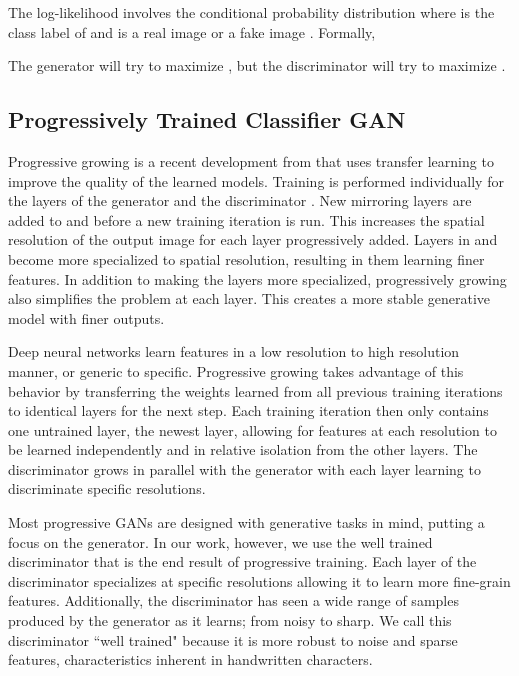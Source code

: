 \documentclass[runningheads]{llncs}
\begin{document}
The log-likelihood  involves the conditional probability distribution   where  is the class label  of  and  is a real image  or a fake image . Formally, 

The generator  will  try to maximize , but the discriminator  will try to maximize .


\subsection{Progressively Trained Classifier GAN}\label{prog}

Progressive growing is a recent development from \cite{nvidia2017progressive} that uses transfer learning to improve the quality of the learned models. Training is performed individually for the layers of the generator  and the discriminator . New mirroring layers are added to  and  before a new training iteration is run. This increases the spatial resolution of the output image for each layer progressively added. Layers in  and  become more specialized to  spatial resolution, resulting in them learning finer features. In addition to making the layers more specialized, progressively growing also simplifies the problem at each layer. This creates a more stable generative model with finer outputs. 

Deep neural networks learn features in a low resolution to high resolution manner, or generic to specific. Progressive growing takes advantage of this behavior by transferring the weights learned from all previous training iterations to identical layers for the next step. Each training iteration then only contains one untrained layer, the newest layer, allowing for features at each resolution to be learned independently and in relative isolation from the other layers. The discriminator grows in parallel with the generator with each layer learning to discriminate specific resolutions.

Most progressive GANs are designed with generative tasks in mind, putting a focus on the generator. In our work, however, we use the well trained discriminator that is the end result of progressive training. Each layer of the discriminator specializes at specific resolutions allowing it to learn more fine-grain features. Additionally, the discriminator has seen a wide range of samples produced by the generator as it learns; from noisy to sharp. We call this discriminator ``well trained" because it is more robust to noise and sparse features, characteristics inherent in handwritten characters.
\end{document}
